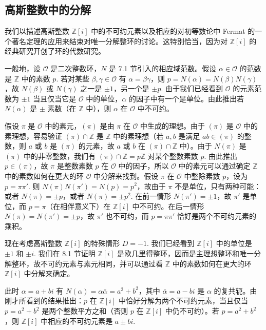 \subsection*{高斯整数中的分解}

我们以描述高斯整数 \(\mathbb{Z}[i]\) 中的不可约元素以及相应的对初等数论中 Fermat 的一个著名定理的应用来结束对唯一分解整环的讨论。这特别恰当，因为对 \(\mathbb{Z}[i]\) 的经典研究开创了环的代数研究。

一般地，设 \(\mathcal{O}\) 是二次整数环，\(N\) 是 7.1 节引入的相应域范数。假设 \(\alpha \in \mathcal{O}\) 的范数是 \(\mathbb{Z}\) 中的素数 \(p\). 若对某些 \(\beta, \gamma \in \mathcal{O}\) 有 \(\alpha = \beta\gamma\)，则 \(p = N(\alpha) = N(\beta)N(\gamma)\)，故 \(N(\beta)\) 或 \(N(\gamma)\) 之一是 \(\pm 1\)，另一个是 \(\pm p\). 由于我们已经看到 \(\mathcal{O}\) 的元素范数为 \(\pm 1\) 当且仅当它是 \(\mathcal{O}\) 中的单位，\(\alpha\) 的因子中有一个是单位。由此推出若 \(N(\alpha)\) 是 \(\pm\) 素数（在 \(\mathbb{Z}\) 中），则 \(\alpha\) 在 \(\mathcal{O}\) 中不可约。

假设 \(\pi\) 是 \(\mathcal{O}\) 中的素元，\((\pi)\) 是由 \(\pi\) 在 \(\mathcal{O}\) 中生成的理想。由于 \((\pi)\) 是 \(\mathcal{O}\) 中的素理想，容易验证 \((\pi) \cap \mathbb{Z}\) 是 \(\mathbb{Z}\) 中的素理想（若 \(a, b\) 是满足 \(ab \in (\pi)\) 的整数，则 \(a\) 或 \(b\) 是 \((\pi)\) 的元素，故 \(a\) 或 \(b\) 在 \((\pi) \cap \mathbb{Z}\) 中）。由于 \(N(\pi)\) 是 \((\pi)\) 中的非零整数，我们有 \((\pi) \cap \mathbb{Z} = p\mathbb{Z}\) 对某个整数素数 \(p\). 由此推出 \(p \in (\pi)\)，故 \(\pi\) 是整数素数 \(p\) 在 \(\mathcal{O}\) 中的因子，所以 \(\mathcal{O}\) 中的素元可以通过确定 \(\mathbb{Z}\) 中的素数如何在更大的环 \(\mathcal{O}\) 中分解来找到。假设 \(\pi\) 在 \(\mathcal{O}\) 中整除素数 \(p\)，设为 \(p = \pi\pi'\). 则 \(N(\pi)N(\pi') = N(p) = p^2\)，故由于 \(\pi\) 不是单位，只有两种可能：或者 \(N(\pi) = \pm p\)，或者 \(N(\pi) = \pm p^2\). 在前一情形 \(N(\pi') = \pm 1\)，故 \(\pi'\) 是单位，而 \(p = \pi\)（在相伴意义下）在 \(\mathbb{Z}[i]\) 中不可约。在后一情形 \(N(\pi) = N(\pi') = \pm p\)，故 \(\pi'\) 也不可约，而 \(p = \pi\pi'\) 恰好是两个不可约元素的乘积。

现在考虑高斯整数 \(\mathbb{Z}[i]\) 的特殊情形 \(D = -1\). 我们已经看到 \(\mathbb{Z}[i]\) 中的单位是 \(\pm 1\) 和 \(\pm i\). 我们在 8.1 节证明 \(\mathbb{Z}[i]\) 是欧几里得整环，因而是主理想整环和唯一分解整环，故不可约元素与素元相同，并可以通过看 \(\mathbb{Z}\) 中的素数如何在更大的环 \(\mathbb{Z}[i]\) 中分解来确定。

此时 \(\alpha = a+bi\) 有 \(N(\alpha) = \alpha\bar\alpha = a^2+b^2\)，其中 \(\bar\alpha = a-bi\) 是 \(\alpha\) 的复共轭。由刚才所看到的结果推出：\(p\) 在 \(\mathbb{Z}[i]\) 中恰好分解为两个不可约元素，当且仅当 \(p = a^2+b^2\) 是两个整数平方之和（否则 \(p\) 在 \(\mathbb{Z}[i]\) 中仍不可约）。若 \(p = a^2+b^2\)，则 \(\mathbb{Z}[i]\) 中相应的不可约元素是 \(a \pm bi\).


